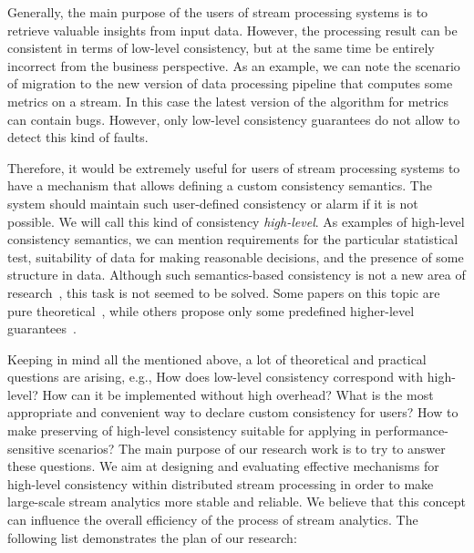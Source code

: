 Generally, the main purpose of the users of stream processing systems is to retrieve valuable insights from input data. However, the processing result can be consistent in terms of low-level consistency, but at the same time be entirely incorrect from the business perspective. As an example, we can note the scenario of migration to the new version of data processing pipeline that computes some metrics on a stream. In this case the latest version of the algorithm for metrics can contain bugs. However, only low-level consistency guarantees do not allow to detect this kind of faults.

Therefore, it would be extremely useful for users of stream processing systems to have a mechanism that allows defining a custom consistency semantics. The system should maintain such user-defined consistency or alarm if it is not possible. We will call this kind of consistency {\em high-level}. As examples of high-level consistency semantics, we can mention requirements for the particular statistical test, suitability of data for making reasonable decisions, and the presence of some structure in data. Although such semantics-based consistency is not a new area of research~\cite{Garcia-Molina:1983:USK:319983.319985}, this task is not seemed to be solved. Some papers on this topic are pure theoretical~\cite{Rodriguez:2008:ITA:1463434.1463480, Guo:2010:CMS:1822018.1822052}, while others propose only some predefined higher-level guarantees~\cite{Mihaila:2008:AIO:1458082.1458132, Fischer:2010:SSP:1739041.1739068}.

Keeping in mind all the mentioned above, a lot of theoretical and practical questions are arising, e.g., How does low-level consistency correspond with high-level? How can it be implemented without high overhead? What is the most appropriate and convenient way to declare custom consistency for users? How to make preserving of high-level consistency suitable for applying in performance-sensitive scenarios? The main purpose of our research work is to try to answer these questions. We aim at designing and evaluating effective mechanisms for high-level consistency within distributed stream processing in order to make large-scale stream analytics more stable and reliable. We believe that this concept can influence the overall efficiency of the process of stream analytics. The following list demonstrates the plan of our research:

